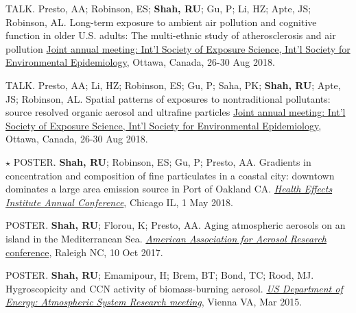 \documentclass{article}
\begin{document}
\begin{etaremune}
\item {\tiny TALK.} Presto, AA; Robinson, ES; \textbf{Shah, RU}; Gu, P; Li, HZ; Apte, JS; Robinson, AL. 
Long-term exposure to ambient air pollution and cognitive function in older U.S. adults: The multi-ethnic study of atherosclerosis and air pollution \href{https://ehp.niehs.nih.gov/doi/10.1289/isesisee.2018.P03.1430}{Joint annual meeting: Int'l Society of Exposure Science, Int'l Society for Environmental Epidemiology}, Ottawa, Canada, 26-30 Aug 2018.
\item {\tiny TALK.} Presto, AA; Li, HZ; Robinson, ES; Gu, P; Saha, PK; \textbf{Shah, RU}; Apte, JS; Robinson, AL. Spatial patterns of exposures to nontraditional pollutants: source resolved organic aerosol and ultrafine particles \href{https://ehp.niehs.nih.gov/doi/abs/10.1289/isesisee.2018.S02.03.08}{Joint annual meeting: Int'l Society of Exposure Science, Int'l Society for Environmental Epidemiology}, Ottawa, Canada, 26-30 Aug 2018.
\item {\Large $\star$} {\tiny POSTER.} \textbf{Shah, RU}; Robinson, ES; Gu, P; Presto, AA. Gradients in concentration and composition of fine particulates in a coastal city: downtown dominates a large area emission source in Port of Oakland CA. \href{https://www.healtheffects.org/sites/default/files/AnnualConferenceProgramBook2018_1.pdf}{\textit{Health Effects Institute Annual Conference}}, Chicago IL, 1 May 2018.
\item {\tiny POSTER.} \textbf{Shah, RU}; Florou, K; Presto, AA. Aging atmospheric aerosols on an island in the Mediterranean Sea. \href{http://aaarabstracts.com/2017/viewabstract.php?pid=200}{\textit{American Association for Aerosol Research} conference}, Raleigh NC, 10 Oct 2017.
\item {\tiny POSTER.} \textbf{Shah, RU}; Emamipour, H; Brem, BT; Bond, TC; Rood, MJ.  Hygroscopicity and CCN activity of biomass-burning aerosol. \textit{\href{http://asr.science.energy.gov/meetings/stm/posters/view?id=1325}{US Department of Energy: Atmospheric System Research meeting}}, Vienna VA, Mar 2015.
\end{etaremune}
\end{document}
